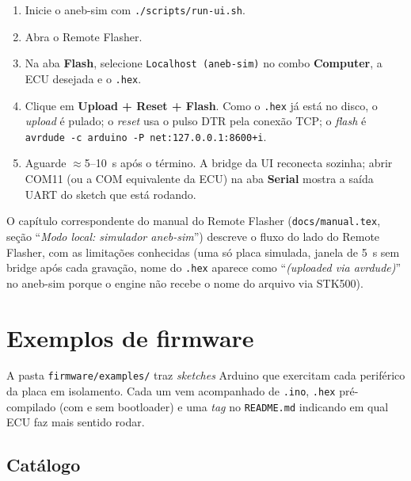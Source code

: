 \documentclass[12pt,a4paper]{article}
\begin{document}
\begin{enumerate}[nosep]
  \item Inicie o aneb-sim com \texttt{./scripts/run-ui.sh}.
  \item Abra o Remote Flasher.
  \item Na aba \textbf{Flash}, selecione
        \texttt{Localhost (aneb-sim)} no combo \textbf{Computer}, a
        ECU desejada e o \texttt{.hex}.
  \item Clique em \textbf{Upload + Reset + Flash}. Como o
        \texttt{.hex} já está no disco, o \emph{upload} é pulado;
        o \emph{reset} usa o pulso DTR pela conexão TCP; o
        \emph{flash} é \texttt{avrdude -c arduino -P net:127.0.0.1:8600+i}.
  \item Aguarde $\approx$5--10~s após o término. A
        bridge da UI reconecta sozinha; abrir COM11 (ou a COM
        equivalente da ECU) na aba \textbf{Serial} mostra a saída
        UART do sketch que está rodando.
\end{enumerate}

\begin{dicabox}
O capítulo correspondente do manual do Remote Flasher
(\texttt{docs/manual.tex}, seção ``\emph{Modo local: simulador
aneb-sim}'') descreve o fluxo do lado do Remote Flasher, com as
limitações conhecidas (uma só placa simulada, janela de 5~s sem
bridge após cada gravação, nome do \texttt{.hex} aparece como
``\emph{(uploaded via avrdude)}'' no aneb-sim porque o engine não
recebe o nome do arquivo via STK500).
\end{dicabox}

\section{Exemplos de firmware}

A pasta \texttt{firmware/examples/} traz \emph{sketches} Arduino que
exercitam cada periférico da placa em isolamento. Cada um vem
acompanhado de \texttt{.ino}, \texttt{.hex} pré-compilado (com e sem
bootloader) e uma \emph{tag} no \texttt{README.md} indicando em qual
ECU faz mais sentido rodar.

\subsection{Catálogo}
\end{document}
